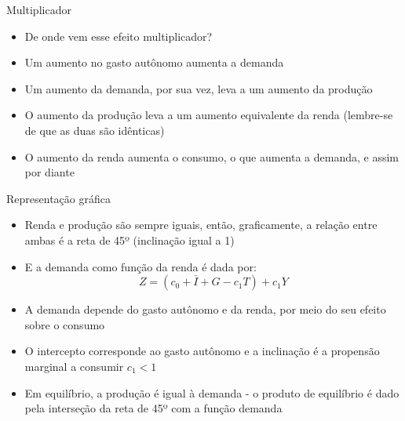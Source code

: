 \documentclass[10pt]{beamer}
\begin{document}
\begin{frame}{Multiplicador}
    \begin{itemize}
        \item De onde vem esse efeito multiplicador?\bigskip
         
        \item Um aumento no gasto autônomo aumenta a demanda\bigskip
         
        \item Um aumento da demanda, por sua vez, leva a um aumento da produção\bigskip
         
        \item O aumento da produção leva a um aumento equivalente da renda (lembre-se de que as duas são idênticas)\bigskip
         
        \item O aumento da renda aumenta o consumo, o que aumenta a demanda, e assim por diante
    \end{itemize}
\end{frame}

\begin{frame}{Representação gráfica}
    \begin{itemize}
        \item Renda e produção são sempre iguais, então, graficamente, a relação entre ambas é a reta de 45º (inclinação igual a 1)\bigskip
         
        \item E a demanda como função da renda é dada por:
        \[
        Z = (c_0 + \bar{I} + G - c_1T) + c_1Y
        \]
         
        \item A demanda depende do gasto autônomo e da renda, por meio do seu efeito sobre o consumo\bigskip
         
        \item O intercepto corresponde ao gasto autônomo e a inclinação é a propensão marginal a consumir $c_1 < 1$\bigskip
         
        \item Em equilíbrio, a produção é igual à demanda - o produto de equilíbrio é dado pela interseção da reta de 45º com a função demanda
    \end{itemize}
\end{frame}
\end{document}
